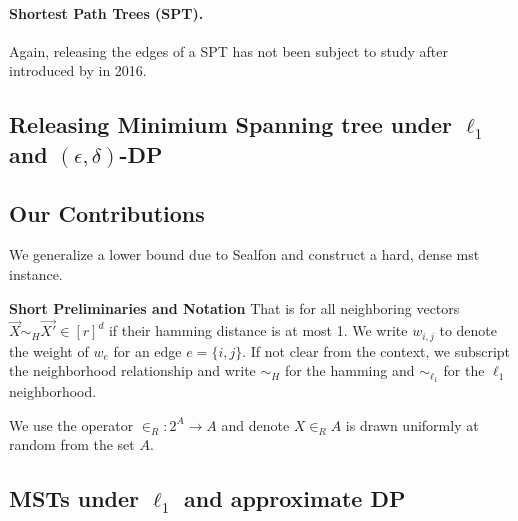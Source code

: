 \documentclass{article}
\newtheorem{theorem}{Theorem}[section]
\begin{document}
\paragraph{Shortest Path Trees (SPT).}
Again, releasing the edges of a SPT has not been subject to study after introduced by \cite{sealfon_shortest_2016} in 2016.

\subsection{Releasing Minimium Spanning tree under $\ell_1$ and $(\epsilon, \delta)$-DP}

%
\subsection{Our Contributions}

We generalize a lower bound due to Sealfon and construct a hard, dense mst instance.

\textbf{Short Preliminaries and Notation}
That is for all neighboring vectors $\vec{X} \sim _H \vec{X'} \in [r]^{d}$ if their hamming distance is at most 1.
We write $w_{i,j}$ to denote the weight of $w_e$ for an edge $e = \{i, j\}$.
If not clear from the context, we subscript the neighborhood relationship and write $\sim_H$ for the hamming and $\sim_{\ell_1}$ for the $\ell_1$ neighborhood.

We use the operator $\in_R: 2^A  \rightarrow A$ and denote $X \in_R A$ is drawn uniformly at random from the set $A$.


\subsection {MSTs under $\ell_1$ and approximate DP }


\end{document}
